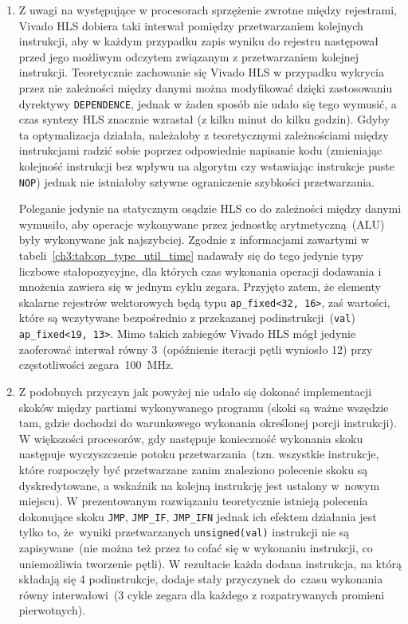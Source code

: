 \begin{enumerate}
\item Z uwagi na występujące w procesorach sprzężenie zwrotne między rejestrami, Vivado HLS dobiera taki interwał pomiędzy przetwarzaniem kolejnych instrukcji, aby w każdym przypadku zapis wyniku do rejestru następował przed jego możliwym odczytem związanym z przetwarzaniem kolejnej instrukcji. Teoretycznie zachowanie się Vivado HLS w przypadku wykrycia przez nie zależności między danymi można modyfikować dzięki zastosowaniu dyrektywy \texttt{DEPENDENCE}, jednak w żaden sposób nie udało się tego wymusić, a czas syntezy HLS znacznie wzrastał (z kilku minut do kilku godzin). Gdyby ta optymalizacja działała, należałoby z teoretycznymi zależnościami między instrukcjami radzić sobie poprzez odpowiednie napisanie kodu (zmieniając kolejność instrukcji bez wpływu na algorytm czy wstawiając instrukcje puste \texttt{NOP}) jednak nie istniałoby sztywne ograniczenie szybkości przetwarzania. 

Poleganie jedynie na statycznym osądzie HLS co do zależności między danymi wymusiło, aby operacje wykonywane przez jednostkę arytmetyczną~(ALU) były wykonywane jak najszybciej. Zgodnie z informacjami zawartymi w tabeli~\ref{ch3:tab:op_type_util_time} nadawały się do tego jedynie typy liczbowe stałopozycyjne, dla których czas wykonania operacji dodawania i mnożenia zawiera się w jednym cyklu zegara. Przyjęto zatem, że elementy skalarne rejestrów wektorowych będą typu \texttt{ap\_fixed<32, 16>}, zaś wartości, które są wczytywane bezpośrednio z przekazanej podinstrukcji~(\texttt{val}) \texttt{ap\_fixed<19, 13>}. Mimo takich zabiegów Vivado HLS mógł jedynie zaoferować interwał równy 3~(opóźnienie iteracji pętli wyniosło 12) przy częstotliwości zegara~100~MHz. 

\item Z podobnych przyczyn jak powyżej nie udało się dokonać implementacji skoków między partiami wykonywanego programu (skoki są ważne wszędzie tam, gdzie dochodzi do warunkowego wykonania określonej porcji instrukcji). W większości procesorów, gdy następuje konieczność wykonania skoku następuje wyczyszczenie potoku przetwarzania~(tzn. wszystkie instrukcje, które rozpoczęły być przetwarzane zanim znaleziono polecenie skoku są dyskredytowane, a wskaźnik na kolejną instrukcję jest ustalony w~nowym miejscu). W prezentowanym rozwiązaniu teoretycznie istnieją polecenia dokonujące skoku \texttt{JMP}, \texttt{JMP\_IF}, \texttt{JMP\_IFN} jednak ich efektem działania jest tylko to, że~wyniki przetwarzanych \texttt{unsigned(val)} instrukcji nie są zapisywane~(nie można też przez to cofać się w wykonaniu instrukcji, co uniemożliwia tworzenie pętli). W rezultacie każda dodana instrukcja, na którą składają się 4 podinstrukcje, dodaje stały przyczynek do~czasu wykonania równy interwałowi~(3 cykle zegara dla każdego z rozpatrywanych promieni pierwotnych). 


\end{enumerate}
